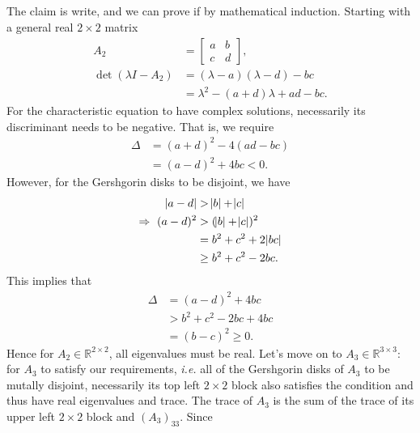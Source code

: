 \documentclass[11pt]{article}
\begin{document}
\subsection{}
The claim is write, and we can prove if by mathematical induction. Starting with a general real $2\times2$ matrix
\begin{equation}\begin{split}
A_2 &= \begin{bmatrix} a & b \\ c & d \end{bmatrix},\\ 
\det(\lambda I - A_2) &= (\lambda-a)(\lambda - d) - bc \\
&= \lambda^2 - (a + d)\lambda + ad - bc. 
\end{split}\nonumber\end{equation} 
For the characteristic equation to have complex solutions, necessarily its discriminant needs to be negative. That is, we require
\begin{equation}\begin{split}
\Delta &= (a+d)^2 -4(ad-bc) \\
&= (a-d)^2+4bc < 0.
\end{split}\nonumber\end{equation} 
However, for the Gershgorin disks to be disjoint, we have 
\begin{equation}\begin{split} 
\abs{a-d} &> \abs{b} + \abs{c}\\
\Rightarrow \,\, (a-d)^2 &> (\abs{b}+\abs{c})^2 \\
&=b^2+c^2+2\abs{bc} \\
&\geq b^2+ c^2 - 2bc.
\end{split}\nonumber\end{equation} 
This implies that 
\begin{equation}\begin{split} 
\Delta& = (a-d)^2+4bc \\
&>b^2+c^2-2bc+4bc \\
&=(b-c)^2 \geq0.
\end{split}\nonumber\end{equation} 
Hence for $A_2\in\mathbb{R}^{2\times2}$, all eigenvalues must be real. Let's move on to $A_3\in\mathbb{R}^{3\times3}$: for $A_3$ to satisfy our requirements, \textit{i.e.} all of the Gershgorin disks of $A_3$ to be mutally disjoint, necessarily its top left $2\times2$ block also satisfies the condition and thus have real eigenvalues and trace. The trace of $A_3$ is the sum of the trace of its upper left $2\times2$ block and $(A_3)_{33}$. Since 
\end{document}
